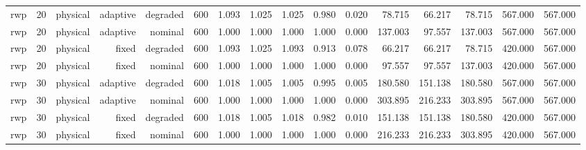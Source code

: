 \begin{tabular}{lrrrrrrrrrrrrrrr}
rwp & 20 & physical & adaptive & degraded & 600 & 1.093 & 1.025 & 1.025 & 0.980 & 0.020 & 78.715 & 66.217 & 78.715 & 567.000 & 567.000 \\
rwp & 20 & physical & adaptive & nominal & 600 & 1.000 & 1.000 & 1.000 & 1.000 & 0.000 & 137.003 & 97.557 & 137.003 & 567.000 & 567.000 \\
rwp & 20 & physical & fixed & degraded & 600 & 1.093 & 1.025 & 1.093 & 0.913 & 0.078 & 66.217 & 66.217 & 78.715 & 420.000 & 567.000 \\
rwp & 20 & physical & fixed & nominal & 600 & 1.000 & 1.000 & 1.000 & 1.000 & 0.000 & 97.557 & 97.557 & 137.003 & 420.000 & 567.000 \\
rwp & 30 & physical & adaptive & degraded & 600 & 1.018 & 1.005 & 1.005 & 0.995 & 0.005 & 180.580 & 151.138 & 180.580 & 567.000 & 567.000 \\
rwp & 30 & physical & adaptive & nominal & 600 & 1.000 & 1.000 & 1.000 & 1.000 & 0.000 & 303.895 & 216.233 & 303.895 & 567.000 & 567.000 \\
rwp & 30 & physical & fixed & degraded & 600 & 1.018 & 1.005 & 1.018 & 0.982 & 0.010 & 151.138 & 151.138 & 180.580 & 420.000 & 567.000 \\
rwp & 30 & physical & fixed & nominal & 600 & 1.000 & 1.000 & 1.000 & 1.000 & 0.000 & 216.233 & 216.233 & 303.895 & 420.000 & 567.000 \\
\bottomrule
\end{tabular}